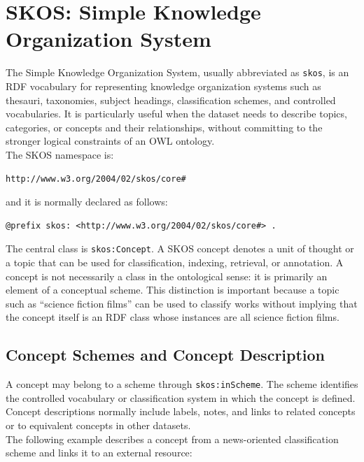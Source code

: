 \documentclass{scrbook}
\begin{document}
	\section{SKOS: Simple Knowledge Organization System}
	
	The Simple Knowledge Organization System, usually abbreviated as \texttt{skos}, is an RDF vocabulary for representing knowledge organization systems such as thesauri, taxonomies, subject headings, classification schemes, and controlled vocabularies. It is particularly useful when the dataset needs to describe topics, categories, or concepts and their relationships, without committing to the stronger logical constraints of an OWL ontology.\\
	
	The SKOS namespace is:
	
	\begin{lstlisting}
http://www.w3.org/2004/02/skos/core#
	\end{lstlisting}
	
	and it is normally declared as follows:
	
	\begin{lstlisting}
@prefix skos: <http://www.w3.org/2004/02/skos/core#> .
	\end{lstlisting}
	
	The central class is \texttt{skos:Concept}. A SKOS concept denotes a unit of thought or a topic that can be used for classification, indexing, retrieval, or annotation. A concept is not necessarily a class in the ontological sense: it is primarily an element of a conceptual scheme. This distinction is important because a topic such as ``science fiction films'' can be used to classify works without implying that the concept itself is an RDF class whose instances are all science fiction films.
	
	\subsection{Concept Schemes and Concept Description}
	
	A concept may belong to a scheme through \texttt{skos:inScheme}. The scheme identifies the controlled vocabulary or classification system in which the concept is defined. Concept descriptions normally include labels, notes, and links to related concepts or to equivalent concepts in other datasets.\\
	
	The following example describes a concept from a news-oriented classification scheme and links it to an external resource:
	
\end{document}
